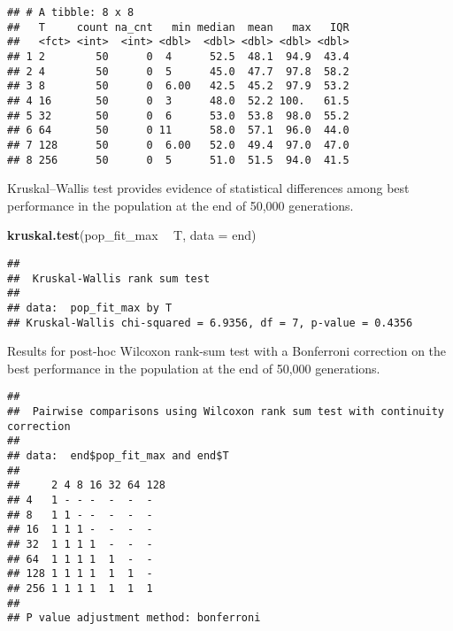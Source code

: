 \documentclass[]{book}
\newenvironment{Shaded}{\begin{snugshade}}{\end{snugshade}}
\newcommand{\DataTypeTok}[1]{\textcolor[rgb]{0.13,0.29,0.53}{#1}}
\newcommand{\KeywordTok}[1]{\textcolor[rgb]{0.13,0.29,0.53}{\textbf{#1}}}
\newcommand{\NormalTok}[1]{#1}
\newcommand{\OperatorTok}[1]{\textcolor[rgb]{0.81,0.36,0.00}{\textbf{#1}}}
\newcommand{\OtherTok}[1]{\textcolor[rgb]{0.56,0.35,0.01}{#1}}
\newcommand{\StringTok}[1]{\textcolor[rgb]{0.31,0.60,0.02}{#1}}
\begin{document}
\begin{verbatim}
## # A tibble: 8 x 8
##   T     count na_cnt   min median  mean   max   IQR
##   <fct> <int>  <int> <dbl>  <dbl> <dbl> <dbl> <dbl>
## 1 2        50      0  4      52.5  48.1  94.9  43.4
## 2 4        50      0  5      45.0  47.7  97.8  58.2
## 3 8        50      0  6.00   42.5  45.2  97.9  53.2
## 4 16       50      0  3      48.0  52.2 100.   61.5
## 5 32       50      0  6      53.0  53.8  98.0  55.2
## 6 64       50      0 11      58.0  57.1  96.0  44.0
## 7 128      50      0  6.00   52.0  49.4  97.0  47.0
## 8 256      50      0  5      51.0  51.5  94.0  41.5
\end{verbatim}

Kruskal--Wallis test provides evidence of statistical differences among best performance in the population at the end of 50,000 generations.

\begin{Shaded}
\begin{Highlighting}[]
\KeywordTok{kruskal.test}\NormalTok{(pop_fit_max }\OperatorTok{~}\StringTok{ }\NormalTok{T, }\DataTypeTok{data =}\NormalTok{ end)}
\end{Highlighting}
\end{Shaded}

\begin{verbatim}
## 
##  Kruskal-Wallis rank sum test
## 
## data:  pop_fit_max by T
## Kruskal-Wallis chi-squared = 6.9356, df = 7, p-value = 0.4356
\end{verbatim}

Results for post-hoc Wilcoxon rank-sum test with a Bonferroni correction on the best performance in the population at the end of 50,000 generations.

\begin{Shaded}
\end{Shaded}

\begin{verbatim}
## 
##  Pairwise comparisons using Wilcoxon rank sum test with continuity correction 
## 
## data:  end$pop_fit_max and end$T 
## 
##     2 4 8 16 32 64 128
## 4   1 - - -  -  -  -  
## 8   1 1 - -  -  -  -  
## 16  1 1 1 -  -  -  -  
## 32  1 1 1 1  -  -  -  
## 64  1 1 1 1  1  -  -  
## 128 1 1 1 1  1  1  -  
## 256 1 1 1 1  1  1  1  
## 
## P value adjustment method: bonferroni
\end{verbatim}
\end{document}

